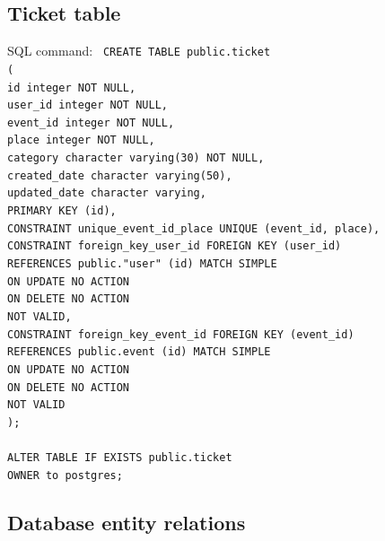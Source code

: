 \subsection{Ticket table}\label{subsec:ticket-table}

SQL command: \newline
\texttt{
    CREATE TABLE public.ticket \\
    ( \\
    id integer NOT NULL,\\
    user\_id integer NOT NULL,\\
    event\_id integer NOT NULL,\\
    place integer NOT NULL,\\
    category character varying(30) NOT NULL,\\
    created\_date character varying(50),\\
    updated\_date character varying,\\
    PRIMARY KEY (id),\\
    CONSTRAINT unique\_event\_id\_place UNIQUE (event\_id, place),\\
    CONSTRAINT foreign\_key\_user\_id FOREIGN KEY (user\_id)\\
    REFERENCES public."user" (id) MATCH SIMPLE\\
    ON UPDATE NO ACTION\\
    ON DELETE NO ACTION\\
    NOT VALID,\\
    CONSTRAINT foreign\_key\_event\_id FOREIGN KEY (event\_id)\\
    REFERENCES public.event (id) MATCH SIMPLE\\
    ON UPDATE NO ACTION\\
    ON DELETE NO ACTION\\
    NOT VALID\\
    );\\
    \\
    ALTER TABLE IF EXISTS public.ticket\\
    OWNER to postgres;\\
}

\subsection{Database entity relations}\label{subsec:database-entity-relations}

